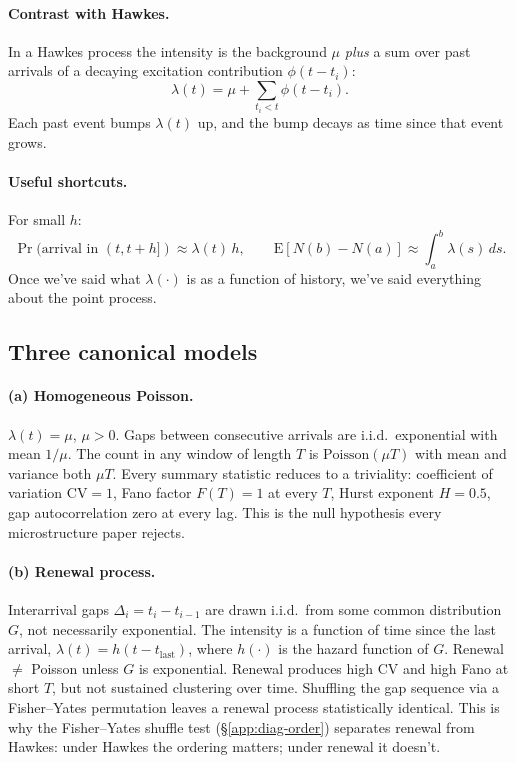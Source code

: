\paragraph{Contrast with Hawkes.} In a Hawkes process the intensity is the background $\mu$ \emph{plus} a sum over past arrivals of a decaying excitation contribution $\phi(t - t_i)$:
$$\lambda(t) = \mu + \sum_{t_i < t} \phi(t - t_i).$$
Each past event bumps $\lambda(t)$ up, and the bump decays as time since that event grows.

\paragraph{Useful shortcuts.} For small $h$:
$$\Pr(\text{arrival in }(t, t+h]) \approx \lambda(t)\, h, \qquad \mathrm{E}[N(b) - N(a)] \approx \int_a^b \lambda(s)\, ds.$$
Once we've said what $\lambda(\cdot)$ is as a function of history, we've said everything about the point process.

\subsection{Three canonical models}
\label{app:pp-canon}

\paragraph{(a) Homogeneous Poisson.} $\lambda(t) = \mu$, $\mu > 0$. Gaps between consecutive arrivals are i.i.d.\ exponential with mean $1/\mu$. The count in any window of length $T$ is $\mathrm{Poisson}(\mu T)$ with mean and variance both $\mu T$. Every summary statistic reduces to a triviality: coefficient of variation $\mathrm{CV} = 1$, Fano factor $F(T) = 1$ at every $T$, Hurst exponent $H = 0.5$, gap autocorrelation zero at every lag. This is the null hypothesis every microstructure paper rejects.

\paragraph{(b) Renewal process.} Interarrival gaps $\Delta_i = t_i - t_{i-1}$ are drawn i.i.d.\ from some common distribution $G$, not necessarily exponential. The intensity is a function of time since the last arrival, $\lambda(t) = h(t - t_{\mathrm{last}})$, where $h(\cdot)$ is the hazard function of $G$. Renewal $\neq$ Poisson unless $G$ is exponential. Renewal produces high CV and high Fano at short $T$, but not sustained clustering over time. Shuffling the gap sequence via a Fisher--Yates permutation leaves a renewal process statistically identical. This is why the Fisher--Yates shuffle test (\S\ref{app:diag-order}) separates renewal from Hawkes: under Hawkes the ordering matters; under renewal it doesn't.

